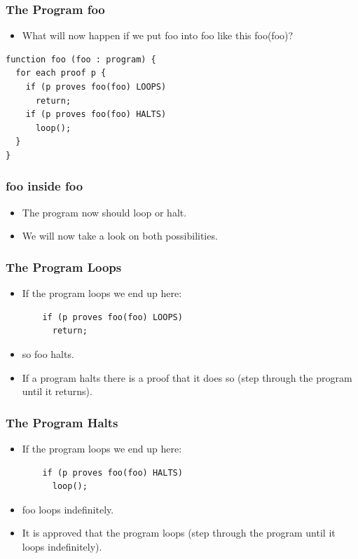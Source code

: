 \documentclass[aspectratio=169]{beamer}
\begin{document}
\begin{frame}[fragile]
	\frametitle{The Program foo}
	\begin{itemize}
		\item What will now happen if we put foo into foo like this foo(foo)?
	\end{itemize}
	\begin{center}
	  \begin{lstlisting}[frame=single]
function foo (foo : program) {
  for each proof p {
    if (p proves foo(foo) LOOPS) 
      return;
    if (p proves foo(foo) HALTS)
      loop();
  }
}
   \end{lstlisting}
   	\end{center}
\end{frame}

\begin{frame}
	\frametitle{foo inside foo}
	\begin{itemize}
		\item The program now should loop or halt.
		\item We will now take a look on both possibilities. 
	\end{itemize}
\end{frame}

\begin{frame}[fragile]
	\frametitle{The Program Loops}
	\begin{itemize}
		\item If the program loops we end up here:
		\begin{center}
	  \begin{lstlisting}
    if (p proves foo(foo) LOOPS) 
      return;
   \end{lstlisting}
   	\end{center}
		\item so foo halts.
		\item If a program halts there is a proof that it does so (step through the program until it returns).
	\end{itemize}
\end{frame}

\begin{frame}[fragile]
	\frametitle{The Program Halts}
	\begin{itemize}
		\item If the program loops we end up here:
		\begin{center}
	  \begin{lstlisting}
    if (p proves foo(foo) HALTS)
      loop();
   \end{lstlisting}
   	\end{center}
		\item foo loops indefinitely.
		\item It is approved that the program loops (step through the program until it loops indefinitely).
	\end{itemize}
\end{frame}
\end{document}
